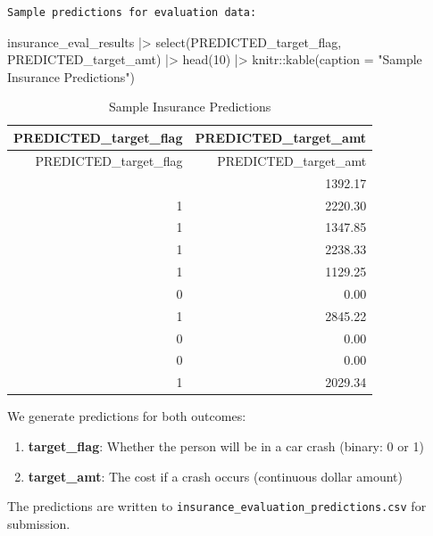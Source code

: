 \documentclass[
  11pt]{article}
\newenvironment{Shaded}{\begin{snugshade}}{\end{snugshade}}
\newcommand{\AttributeTok}[1]{\textcolor[rgb]{0.40,0.45,0.13}{#1}}
\newcommand{\DecValTok}[1]{\textcolor[rgb]{0.68,0.00,0.00}{#1}}
\newcommand{\FunctionTok}[1]{\textcolor[rgb]{0.28,0.35,0.67}{#1}}
\newcommand{\NormalTok}[1]{\textcolor[rgb]{0.00,0.23,0.31}{#1}}
\newcommand{\SpecialCharTok}[1]{\textcolor[rgb]{0.37,0.37,0.37}{#1}}
\newcommand{\StringTok}[1]{\textcolor[rgb]{0.13,0.47,0.30}{#1}}
\providecommand{\tightlist}{%
  \setlength{\itemsep}{0pt}\setlength{\parskip}{0pt}}
\begin{document}
\begin{verbatim}
Sample predictions for evaluation data:
\end{verbatim}

\begin{Shaded}
\begin{Highlighting}[]
\NormalTok{insurance\_eval\_results }\SpecialCharTok{|\textgreater{}}
    \FunctionTok{select}\NormalTok{(PREDICTED\_target\_flag, PREDICTED\_target\_amt) }\SpecialCharTok{|\textgreater{}}
    \FunctionTok{head}\NormalTok{(}\DecValTok{10}\NormalTok{) }\SpecialCharTok{|\textgreater{}}
\NormalTok{    knitr}\SpecialCharTok{::}\FunctionTok{kable}\NormalTok{(}\AttributeTok{caption =} \StringTok{"Sample Insurance Predictions"}\NormalTok{)}
\end{Highlighting}
\end{Shaded}

\begin{longtable}[]{@{}rr@{}}
\caption{Sample Insurance Predictions}\tabularnewline
\toprule\noalign{}
PREDICTED\_target\_flag & PREDICTED\_target\_amt \\
\midrule\noalign{}
\endfirsthead
\toprule\noalign{}
PREDICTED\_target\_flag & PREDICTED\_target\_amt \\
\midrule\noalign{}
\endhead
\bottomrule\noalign{}
\endlastfoot
1 & 1392.17 \\
1 & 2220.30 \\
1 & 1347.85 \\
1 & 2238.33 \\
1 & 1129.25 \\
0 & 0.00 \\
1 & 2845.22 \\
0 & 0.00 \\
0 & 0.00 \\
1 & 2029.34 \\
\end{longtable}

We generate predictions for both outcomes:

\begin{enumerate}
\def\labelenumi{\arabic{enumi}.}
\tightlist
\item
  \textbf{target\_flag}: Whether the person will be in a car crash
  (binary: 0 or 1)
\item
  \textbf{target\_amt}: The cost if a crash occurs (continuous dollar
  amount)
\end{enumerate}

The predictions are written to
\texttt{insurance\_evaluation\_predictions.csv} for submission.
\end{document}
